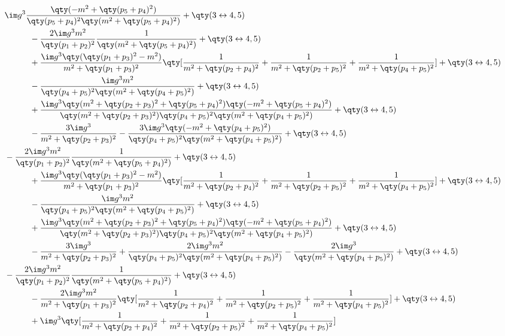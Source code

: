 \begin{align*}
    &\im g^3\frac{\qty(-m^2+\qty(p_5+p_4)^2)}{\qty(p_5+p_4)^2\qty(m^2+\qty(p_5+p_4)^2)}+\qty(3\leftrightarrow4,5)\\
    &\quad\quad\quad-\frac{2\im g^3m^2}{\qty(p_1+p_2)^2}\frac{1}{\qty(m^2+\qty(p_5+p_4)^2)}+\qty(3\leftrightarrow4,5)\\
    &\quad\quad\quad+\frac{\im g^3\qty(\qty(p_1+p_3)^2-m^2)}{m^2+\qty(p_1+p_3)^2}\qty[\frac{1}{m^2+\qty(p_2+p_4)^2}+\frac{1}{m^2+\qty(p_2+p_5)^2}+\frac{1}{m^2+\qty(p_4+p_5)^2}]+\qty(3\leftrightarrow4,5)\\
    &\quad\quad\quad-\frac{\im g^3m^2}{\qty(p_4+p_5)^2\qty(m^2+\qty(p_4+p_5)^2)}+\qty(3\leftrightarrow4,5)\\
    &\quad\quad\quad+\frac{\im g^3\qty(m^2+\qty(p_2+p_3)^2+\qty(p_5+p_4)^2)\qty(-m^2+\qty(p_5+p_4)^2)}{\qty(m^2+\qty(p_2+p_3)^2)\qty(p_4+p_5)^2\qty(m^2+\qty(p_4+p_5)^2)}+\qty(3\leftrightarrow4,5)\\
    &\quad\quad\quad-\frac{3\im g^3}{m^2+\qty(p_2+p_3)^2}-\frac{3\im g^3\qty(-m^2+\qty(p_4+p_5)^2)}{\qty(p_4+p_5)^2\qty(m^2+\qty(p_4+p_5)^2)}+\qty(3\leftrightarrow4,5)\\
    &-\frac{2\im g^3m^2}{\qty(p_1+p_2)^2}\frac{1}{\qty(m^2+\qty(p_5+p_4)^2)}+\qty(3\leftrightarrow4,5)\\
    &\quad\quad\quad+\frac{\im g^3\qty(\qty(p_1+p_3)^2-m^2)}{m^2+\qty(p_1+p_3)^2}\qty[\frac{1}{m^2+\qty(p_2+p_4)^2}+\frac{1}{m^2+\qty(p_2+p_5)^2}+\frac{1}{m^2+\qty(p_4+p_5)^2}]+\qty(3\leftrightarrow4,5)\\
    &\quad\quad\quad-\frac{\im g^3m^2}{\qty(p_4+p_5)^2\qty(m^2+\qty(p_4+p_5)^2)}+\qty(3\leftrightarrow4,5)\\
    &\quad\quad\quad+\frac{\im g^3\qty(m^2+\qty(p_2+p_3)^2+\qty(p_5+p_4)^2)\qty(-m^2+\qty(p_5+p_4)^2)}{\qty(m^2+\qty(p_2+p_3)^2)\qty(p_4+p_5)^2\qty(m^2+\qty(p_4+p_5)^2)}+\qty(3\leftrightarrow4,5)\\
    &\quad\quad\quad-\frac{3\im g^3}{m^2+\qty(p_2+p_3)^2}+\frac{2\im g^3m^2}{\qty(p_4+p_5)^2\qty(m^2+\qty(p_4+p_5)^2)}-\frac{2\im g^3}{\qty(m^2+\qty(p_4+p_5)^2)}+\qty(3\leftrightarrow4,5)\\
    &-\frac{2\im g^3m^2}{\qty(p_1+p_2)^2}\frac{1}{\qty(m^2+\qty(p_5+p_4)^2)}+\qty(3\leftrightarrow4,5)\\
    &\quad\quad\quad-\frac{2\im g^3m^2}{m^2+\qty(p_1+p_3)^2}\qty[\frac{1}{m^2+\qty(p_2+p_4)^2}+\frac{1}{m^2+\qty(p_2+p_5)^2}+\frac{1}{m^2+\qty(p_4+p_5)^2}]+\qty(3\leftrightarrow4,5)\\
    &\quad\quad\quad+\im g^3\qty[\frac{1}{m^2+\qty(p_2+p_4)^2}+\frac{1}{m^2+\qty(p_2+p_5)^2}+\frac{1}{m^2+\qty(p_4+p_5)^2}]\\

\end{align*}
